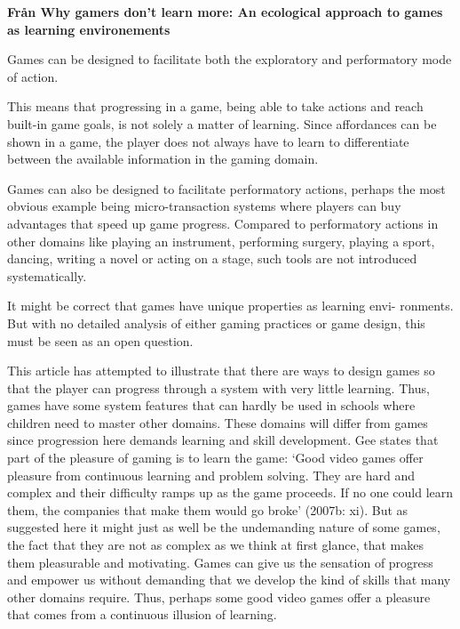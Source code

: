 \textbf{Från Why gamers don't learn more: An ecological approach to games as learning environements}

Games can be designed to facilitate both the exploratory and performatory mode of action.

This means that progressing in a game, being able to take actions and reach built-in game goals, is not solely a matter of learning. Since affordances can be shown in a game, the player does not always have to learn to differentiate between the available information in the gaming domain.

Games can also be designed to facilitate performatory actions, perhaps the most obvious example being micro-transaction systems where players can buy advantages that speed up game progress. Compared to performatory actions in other domains like playing an instrument, performing surgery, playing a sport, dancing, writing a novel or acting on a stage, such tools are not introduced systematically.

It might be correct that games have unique properties as learning envi- ronments. But with no detailed analysis of either gaming practices or game design, this must be seen as an open question.

This article has attempted to illustrate that there are ways to design games so that the player can progress through a system with very little learning. Thus, games have some system features that can hardly be used in schools where children need to master other domains. These domains will differ from games since progression here demands learning and skill development. Gee states that part of the pleasure of gaming is to learn the game: ‘Good video games offer pleasure from continuous learning and problem solving. They are hard and complex and their difficulty ramps up as the game proceeds. If no one could learn them, the companies that make them would go broke’ (2007b: xi). But as suggested here it might just as well be the undemanding nature of some games, the fact that they are not as complex as we think at first glance, that makes them pleasurable and motivating. Games can give us the sensation of progress and empower us without demanding that we develop the kind of skills that many other domains require. Thus, perhaps some good video games offer a pleasure that comes from a continuous illusion of learning.

